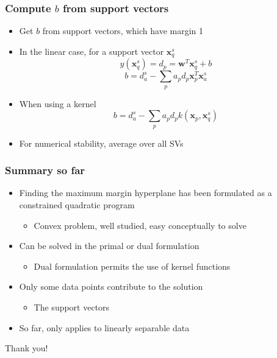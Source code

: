 \documentclass[12pt,notes,mathserif]{beamer}
\newcommand{\chuhao}{\fontsize{44.9pt}{\baselineskip}\selectfont}
\begin{document}
\begin{frame}[c]
\frametitle{Compute $b$ from support vectors}
\begin{itemize}
\item Get $b$ from support vectors, which have margin 1
\item In the linear case, for a support vector $\mathbf{x}_q^s$
\[
y(\mathbf{x}_q^s)=d_p=\mathbf{w}^T\mathbf{x}_q^s+b
\]
\[
b=d_a^s -\sum_pa_pd_p\mathbf{x}_p^T\mathbf{x}_a^s
\]
\item When using a kernel
\[
b=d_a^s-\sum_pa_pd_pk(\mathbf{x}_p,\mathbf{x}_q^s)
\]
\item For numerical stability, average over all SVs
\end{itemize}
\end{frame}


\begin{frame}[c]
\frametitle{Summary so far}
\begin{itemize}
\item Finding the maximum margin hyperplane has been formulated as a constrained quadratic program
\begin{itemize}
\item Convex problem, well studied, easy conceptually to solve
\end{itemize}
\item Can be solved in the primal or dual formulation
\begin{itemize}
\item Dual formulation permits the use of kernel functions
\end{itemize}
\item Only some data points contribute to the solution
\begin{itemize}
\item The support vectors
\end{itemize}
\item So far, only applies to linearly separable data
\end{itemize}
\end{frame}



\begin{frame}
\begin{center}
\chuhao Thank you! %
\end{center}
\end{frame}
\end{document}
